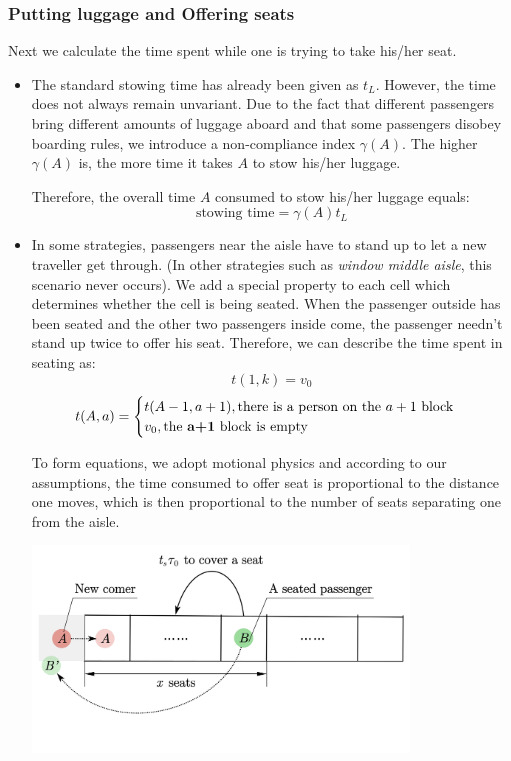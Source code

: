 \documentclass{article}
\theoremstyle{definition}
\theoremstyle{remark}
\numberwithin{equation}{section}
\begin{document}
	\subsubsection{Putting luggage and Offering seats}
	Next we calculate the time spent while one is trying to take his/her seat.
	\begin{itemize}
		\item {}

		The standard stowing time has already been given as \(t_L\). However, the time does not always remain unvariant. Due to the fact that different passengers bring different amounts of luggage aboard and that some passengers disobey boarding rules, we introduce a non-compliance index \(\gamma\left(A\right)\). The higher \(\gamma\left(A\right)\) is, the more time it takes \(A\) to stow his/her luggage.

		Therefore, the overall time \(A\) consumed to stow his/her luggage equals:
		\[\text{stowing time}=\gamma \left( A \right) t_L \]
		\item {}

		In some strategies, passengers near the aisle have to stand up to let a new traveller get through. (In other strategies such as \textit{window middle aisle}, this scenario never occurs). We add a special property to each cell which determines whether the cell is being seated. When the passenger outside has been seated and the other two passengers inside come, the passenger needn't stand up twice to offer his seat. Therefore, we can describe the time spent in seating as:
		$$t(1,k)=v_0$$
		$$t(A,a)=\begin{cases}t(A-1,a+1),\text{there is a person on the $a+1$ block}\\v_0, \text{the \textbf{a+1} block is empty}\end{cases}$$

		To form equations, we adopt motional physics and according to our assumptions, the time consumed to offer seat is proportional to the distance one moves, which is then proportional to the number of seats separating one from the aisle.
		\begin{center}
		\includegraphics[width = 10cm]{offering a seat.jpg}


\end{center}
\end{itemize}
\end{document}
